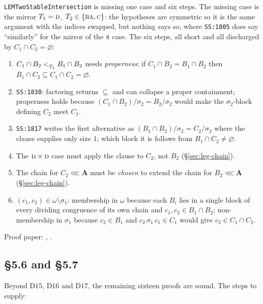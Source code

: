 \texttt{LEMTwoStableIntersection} is missing one case and six steps. The
missing case is the mirror $T_{1}=\textup{\textsc{d}}$, $T_{2}\in\{\textup{\textsc{ba}},\textup{\textsc{c}}\}$: the hypotheses
are symmetric so it is the same argument with the indices swapped, but nothing
says so, where \texttt{SS:1805} does say ``similarly'' for the mirror of the
$\textup{\textsc{s}}$ case. The six steps, all short and all discharged by
$C_{1}\cap C_{2}=\varnothing$:

\begin{enumerate}\tightlist
\item $C_{1}\cap B_{2}<_{T_{1}}^{}B_{1}\cap B_{2}$ needs \emph{properness}: if
  $C_{1}\cap B_{2}=B_{1}\cap B_{2}$ then $B_{1}\cap C_{2}\subseteq
  C_{1}\cap C_{2}=\varnothing$.
\item \texttt{SS:1830}: factoring returns $\subseteq$ and can collapse a proper
  containment; properness holds because $(C_{1}\cap B_{2})/\sigma_{2}=
  B_{2}/\sigma_{2}$ would make the $\sigma_{2}$-block defining $C_{2}$ meet
  $C_{1}$.
\item \texttt{SS:1817} writes the first alternative as $(B_{1}\cap B_{2})/
  \sigma_{2}=C_{2}/\sigma_{2}$ where the clause supplies only size $1$; which
  block it is follows from $B_{1}\cap C_{2}\neq\varnothing$.
\item The $\textup{\textsc{d}}\times\textup{\textsc{d}}$ case must apply the clause to $C_{2}$, not $B_{2}$
  (\S\ref{sec:leg-chain}).
\item The chain for $C_{2}\lll\mathbf A$ must be \emph{chosen} to extend the
  chain for $B_{2}\lll\mathbf A$ (\S\ref{sec:leg-chain}).
\item $(c_{1},c_{2})\in\omega\setminus\sigma_{1}$: membership in $\omega$
  because each $B_{i}$ lies in a single block of every dividing congruence of
  its own chain and $c_{1},c_{2}\in B_{1}\cap B_{2}$; non-membership in
  $\sigma_{1}$ because $c_{2}\in B_{1}$ and $c_{2}\,\sigma_{1}\,c_{1}\in C_{1}$
  would give $c_{2}\in C_{1}\cap C_{2}$.
\end{enumerate}

Proof paper: , .

\subsection{\S5.6 and \S5.7}\label{sec:exp-5657}

Beyond $\mathrm D15$, $\mathrm D16$ and $\mathrm D17$, the remaining sixteen
proofs are sound. The steps to supply:

